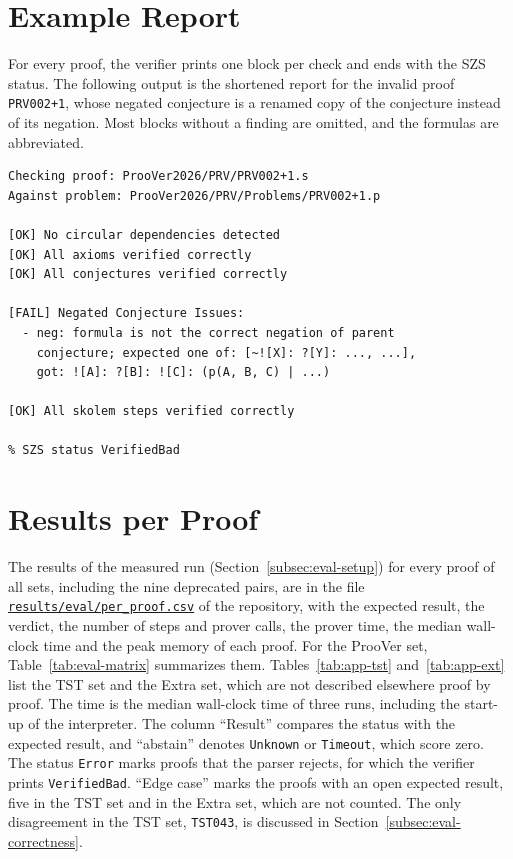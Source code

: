 \section{Example Report}
\label{app:reports}

For every proof, the verifier prints one block per check and ends with the SZS status.
The following output is the shortened report for the invalid proof \texttt{PRV002+1}, whose negated conjecture is a renamed copy of the conjecture instead of its negation.
Most blocks without a finding are omitted, and the formulas are abbreviated.

\noindent\begin{minipage}{\linewidth}
\begin{verbatim}
Checking proof: ProoVer2026/PRV/PRV002+1.s
Against problem: ProoVer2026/PRV/Problems/PRV002+1.p

[OK] No circular dependencies detected
[OK] All axioms verified correctly
[OK] All conjectures verified correctly

[FAIL] Negated Conjecture Issues:
  - neg: formula is not the correct negation of parent
    conjecture; expected one of: [~![X]: ?[Y]: ..., ...],
    got: ![A]: ?[B]: ![C]: (p(A, B, C) | ...)

[OK] All skolem steps verified correctly

% SZS status VerifiedBad
\end{verbatim}
\end{minipage}

\section{Results per Proof}
\label{app:per-proof}

The results of the measured run (Section~\ref{subsec:eval-setup}) for every proof of all sets, including the nine deprecated pairs, are in the file \href{https://github.com/AlexanderGiller/master-thesis-proover/blob/main/results/eval/per_proof.csv}{\texttt{results/eval/per\_proof.csv}} of the repository, with the expected result, the verdict, the number of steps and prover calls, the prover time, the median wall-clock time and the peak memory of each proof.
For the ProoVer set, Table~\ref{tab:eval-matrix} summarizes them.
Tables~\ref{tab:app-tst} and~\ref{tab:app-ext} list the TST set and the Extra set, which are not described elsewhere proof by proof.
The time is the median wall-clock time of three runs, including the start-up of the interpreter. The column ``Result'' compares the status with the expected result, and ``abstain'' denotes \texttt{Unknown} or \texttt{Timeout}, which score zero. The status \texttt{Error} marks proofs that the parser rejects, for which the verifier prints \texttt{VerifiedBad}. ``Edge case'' marks the proofs with an open expected result, five in the TST set and \EvalExtraEdge{} in the Extra set, which are not counted. The only disagreement in the TST set, \texttt{TST043}, is discussed in Section~\ref{subsec:eval-correctness}.

{\small

}

{\small

}
